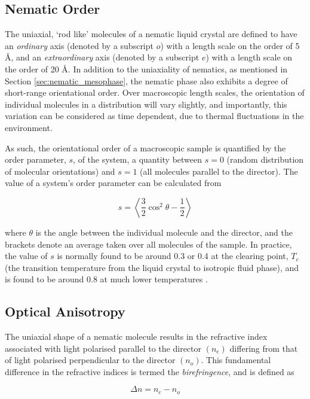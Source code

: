 \subsection{Nematic Order}
The uniaxial, `rod like' molecules of a nematic liquid crystal are defined to have an \textit{ordinary} axis (denoted by a subscript $o$) with a length scale on the order of 5 \AA, and an \textit{extraordinary} axis (denoted by a subscript $e$) with a length scale on the order of 20 \AA. In addition to the uniaxiality of nematics, as mentioned in Section \ref{sec:nematic_mesophase}, the nematic phase also exhibits a degree of short-range orientational order. Over macroscopic length scales, the orientation of individual molecules in a distribution will vary slightly, and importantly, this variation can be considered as time dependent, due to thermal fluctuations in the environment.

As such, the orientational order of a macroscopic sample is quantified by the order parameter, $s$, of the system, a quantity between $s=0$ (random distribution of molecular orientations) and $s=1$ (all molecules parallel to the director)\citep{Collings1997}. The value of a system's order parameter can be calculated from

\begin{equation}
s=\left\langle \frac{3}{2}\cos^2\theta-\frac{1}{2}\right\rangle
\label{eq:Order}
\end{equation}

where $\theta$ is the angle between the individual molecule and the director, and the brackets denote an average taken over all molecules of the sample. In practice, the value of $s$ is normally found to be around 0.3 or 0.4 at the clearing point, $T_c$ (the transition temperature from the liquid crystal to isotropic fluid phase), and is found to be around 0.8 at much lower temperatures \citep{Vertogen1988}. 

\subsection{Optical Anisotropy}
The uniaxial shape of a nematic molecule results in the refractive index associated with light polarised parallel to the director $\left( n_{e}\right)$ differing from that of light polarised perpendicular to the director $\left(n_{o}\right)$. This fundamental difference in the refractive indices is termed the \textit{birefringence}, and is defined as
 
\begin{equation}
\Delta n=n_{e}-n_{o}
\end{equation}

